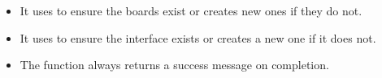 \documentclass[letterpaper,10pt,english]{sphinxmanual}
\begin{document}
\begin{fulllineitems}
\begin{description}
\begin{itemize}
\item {} 
\sphinxAtStartPar
It uses  to ensure the boards exist or creates new ones if they do not.

\item {} 
\sphinxAtStartPar
It uses  to ensure the interface exists or creates a new one if it does not.

\item {} 
\sphinxAtStartPar
The function always returns a success message on completion.

\end{itemize}

\end{description}

\end{fulllineitems}

\end{document}
